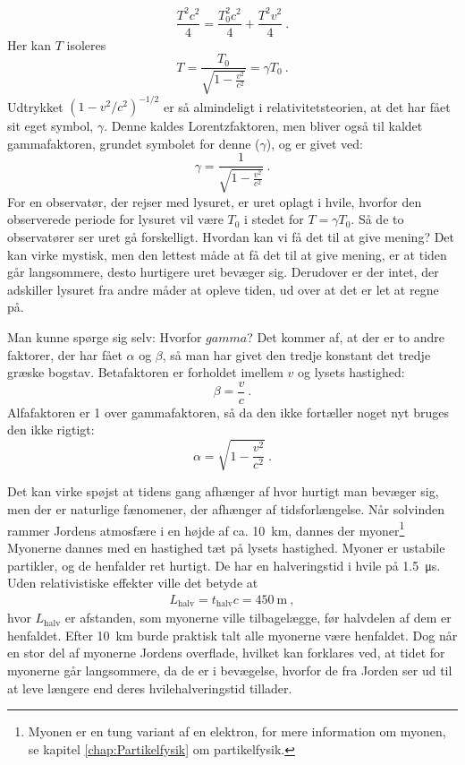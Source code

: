 \begin{equation}
\frac{T^2c^2}{4}=\frac{T_0^2c^2}{4}+\frac{T^2v^2}{4} \: .
\end{equation}
Her kan $T$ isoleres
\begin{equation} \label{rel:Tidsforlaengelse}
    T=\frac{T_0}{\sqrt{1-\frac{v^2}{c^2}}}=\gamma T_0 \: .
\end{equation}
Udtrykket $(1-v^2/c^2)^{-1/2}$ er så almindeligt i relativitetsteorien, at det har fået sit eget symbol, $\gamma$. Denne kaldes Lorentzfaktoren, men bliver også til kaldet gammafaktoren, grundet symbolet for denne ($\gamma$), og er givet ved:
\begin{equation}
    \gamma =\frac{1}{\sqrt{1-\frac{v^2}{c^2}}} \: .
\end{equation}
For en observatør, der rejser med lysuret, er uret oplagt i hvile, hvorfor den observerede periode for lysuret vil være $T_0$ i stedet for $T = \gamma T_0$. Så de to observatører ser uret gå forskelligt.
Hvordan kan vi få det til at give mening?
Det kan virke mystisk, men den lettest måde at få det til at give mening, er at tiden går langsommere, desto hurtigere uret bevæger sig.
Derudover er der intet, der adskiller lysuret fra andre måder at opleve tiden, ud over at det er let at regne på.

Man kunne spørge sig selv: Hvorfor $gamma$? Det kommer af, at der er to andre faktorer, der har fået $\alpha$ og $\beta$, så man har givet den tredje konstant det tredje græske bogstav.
Betafaktoren er forholdet imellem $v$ og lysets hastighed:
\begin{equation}
    \beta=\frac{v}{c} \: .
\end{equation}
Alfafaktoren er 1 over gammafaktoren, så da den ikke fortæller noget nyt bruges den ikke rigtigt:
\begin{equation}
    \alpha=\sqrt{1-\frac{v^2}{c^2}} \: .
\end{equation}

Det kan virke spøjst at tidens gang afhænger af hvor hurtigt man bevæger sig, men der er naturlige fænomener, der afhænger af tidsforlængelse.
Når solvinden rammer Jordens atmosfære i en højde af ca. \SI{10}{\kilo\metre}, dannes der myoner\footnote{Myonen er en tung variant af en elektron, for mere information om myonen, se kapitel \ref{chap:Partikelfysik} om partikelfysik.}
Myonerne dannes med en hastighed tæt på lysets hastighed.
Myoner er ustabile partikler, og de henfalder ret hurtigt.
De har en halveringstid i hvile på \SI{1,5}{\micro\second}.
Uden relativistiske effekter ville det betyde at
\begin{gather}
    L_\text{halv}=t_\text{halv}c=\SI{450}{\metre} \: ,
\end{gather}
hvor $L_\text{halv}$ er afstanden, som myonerne ville tilbagelægge, før halvdelen af dem er henfaldet. Efter \SI{10}{\kilo\metre} burde praktisk talt alle myonerne være henfaldet.
Dog når en stor del af myonerne Jordens overflade, hvilket kan forklares ved, at tidet for myonerne går langsommere, da de er i bevægelse, hvorfor de fra Jorden ser ud til at leve længere end deres hvilehalveringstid tillader.

